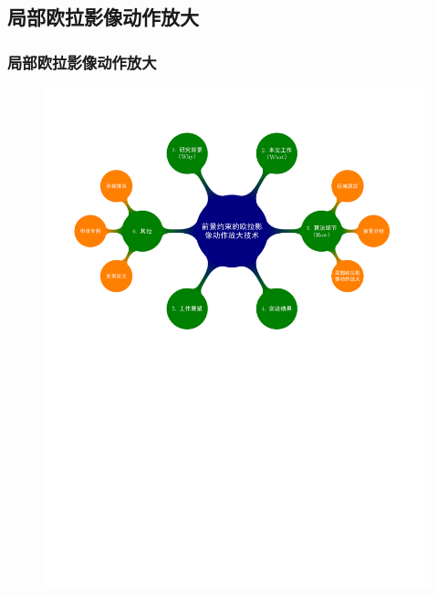 \documentclass[xcolor=svgnames,serif,table]{beamer}
\begin{document}
\subsection{局部欧拉影像动作放大}

\begin{frame}
  \frametitle{局部欧拉影像动作放大}
  \vspace{-2.5em}
  \begin{figure}
    \centering
    \includegraphics[width=\textwidth, page=7]{mindmap.pdf}
  \end{figure}
\end{frame}
\end{document}
